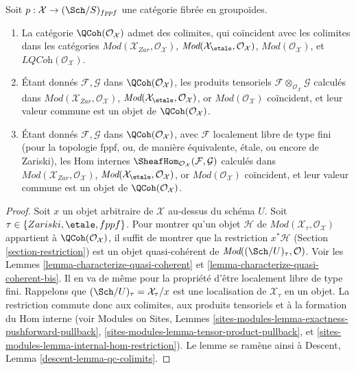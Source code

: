 \begin{lemma}
\label{lemma-qc-colimits}
Soit $p : \mathcal{X} \to (\Sch/S)_{fppf}$ une catégorie
fibrée en groupoïdes.
\begin{enumerate}
\item La catégorie $\QCoh(\mathcal{O}_\mathcal{X})$
admet des colimites, qui coïncident avec les colimites dans les catégories
$\textit{Mod}(\mathcal{X}_{Zar}, \mathcal{O}_\mathcal{X})$,
$\textit{Mod}(\mathcal{X}_\etale, \mathcal{O}_\mathcal{X})$,
$\textit{Mod}(\mathcal{O}_\mathcal{X})$, et
$\textit{LQCoh}(\mathcal{O}_\mathcal{X})$.
\item Étant donnés $\mathcal{F}, \mathcal{G}$ dans $\QCoh(\mathcal{O}_\mathcal{X})$,
les produits tensoriels $\mathcal{F} \otimes_{\mathcal{O}_\mathcal{X}} \mathcal{G}$
calculés dans $\textit{Mod}(\mathcal{X}_{Zar}, \mathcal{O}_\mathcal{X})$,
$\textit{Mod}(\mathcal{X}_\etale, \mathcal{O}_\mathcal{X})$, or
$\textit{Mod}(\mathcal{O}_\mathcal{X})$ coïncident, et leur valeur commune
est un objet de $\QCoh(\mathcal{O}_\mathcal{X})$.
\item Étant donnés $\mathcal{F}, \mathcal{G}$ dans $\QCoh(\mathcal{O}_\mathcal{X})$,
avec $\mathcal{F}$ localement libre de type fini (pour la topologie fppf, ou, de manière
équivalente, étale, ou encore de Zariski), les Hom internes
$\SheafHom_{\mathcal{O}_\mathcal{X}}(\mathcal{F}, \mathcal{G})$
calculés dans $\textit{Mod}(\mathcal{X}_{Zar}, \mathcal{O}_\mathcal{X})$,
$\textit{Mod}(\mathcal{X}_\etale, \mathcal{O}_\mathcal{X})$, or
$\textit{Mod}(\mathcal{O}_\mathcal{X})$ coïncident, et leur valeur commune
est un objet de $\QCoh(\mathcal{O}_\mathcal{X})$.
\end{enumerate}
\end{lemma}

\begin{proof}
Soit $x$ un objet arbitraire de $\mathcal{X}$ au-dessus du schéma $U$.
Soit $\tau \in \{Zariski, \etale, fppf\}$. Pour montrer qu'un objet $\mathcal{H}$
de $\textit{Mod}(\mathcal{X}_\tau, \mathcal{O}_\mathcal{X})$ appartient
à $\QCoh(\mathcal{O}_\mathcal{X})$, il suffit de montrer que la
restriction $x^*\mathcal{H}$ (Section \ref{section-restriction})
est un objet quasi-cohérent de $\textit{Mod}((\Sch/U)_\tau, \mathcal{O})$.
Voir les Lemmes \ref{lemma-characterize-quasi-coherent} et
\ref{lemma-characterize-quasi-coherent-bis}. Il en va de même pour la propriété d'être
localement libre de type fini. Rappelons que $(\Sch/U)_\tau = \mathcal{X}_\tau/x$
est une localisation de $\mathcal{X}_\tau$ en un objet. La restriction
commute donc aux colimites, aux produits tensoriels et à la formation du Hom interne
(voir Modules on Sites, Lemmes
\ref{sites-modules-lemma-exactness-pushforward-pullback},
\ref{sites-modules-lemma-tensor-product-pullback}, et
\ref{sites-modules-lemma-internal-hom-restriction}).
Le lemme se ramène ainsi à Descent, Lemma \ref{descent-lemma-qc-colimits}.
\end{proof}






